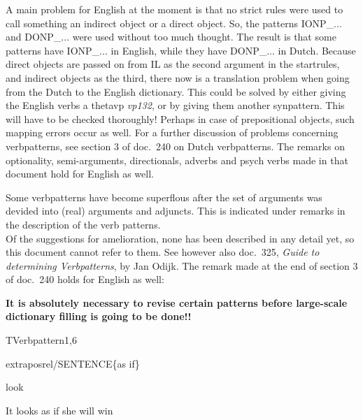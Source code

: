 A main problem for English at the moment is that no strict rules were used to 
call something an indirect object or a direct object. So, the patterns 
IONP\_... and DONP\_... were used without too much thought. The result is that 
some patterns have IONP\_... in English, while they have DONP\_... in Dutch. 
Because direct objects are passed on from IL as the second argument in the 
startrules, and indirect 
objects as the third, there now is a translation problem when going from the 
Dutch to the English dictionary. This could be solved by either giving the 
English verbs a thetavp {\em vp132\/}, or by giving them another synpattern. 
This will have to be checked thoroughly! Perhaps in case of prepositional 
objects, such mapping errors occur as well.
For a further discussion of problems 
concerning verbpatterns, see section 3 of doc.\ 240 on Dutch verbpatterns. The 
remarks on optionality, semi-arguments, directionals, adverbs and psych verbs
made in that document hold for English as well. 

Some verbpatterns have become superflous after the set of arguments was devided 
into (real) arguments and adjuncts. This is indicated under remarks in the 
description of the verb patterns.\\

Of the suggestions for 
amelioration, none has been described in any detail yet, so this document
cannot refer to them. See however also doc.\ 325, {\em Guide to determining 
Verbpatterns\/}, by Jan Odijk. The remark made at the end of 
section 3 of doc.\ 240 holds for English as well: 

{\bf It is absolutely necessary to revise certain patterns before large-scale 
dictionary filling is going to be done!!}



\newpage
\verbpattern{[synASIFSENT] }
\begin{vpattern}
 TVerbpattern1,6
\csritem \mbox{}\\
     \begin{csr}
      extraposrel/SENTENCE\{as if\} 
     \end{csr}
\remarksitem
\end{vpattern}


\begin{thetadescr}
\evitem  look
\esitem
     \begin{examples}
        \example It looks as if she will win
     \end{examples}
\end{thetadescr}



